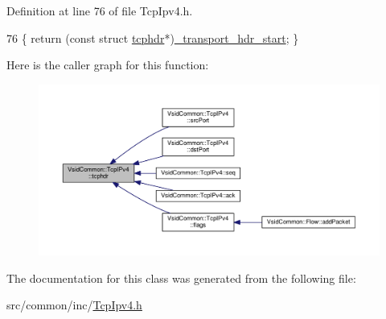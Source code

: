 Definition at line 76 of file Tcp\-Ipv4.\-h.


\begin{DoxyCode}
76 \{ \textcolor{keywordflow}{return} (\textcolor{keyword}{const} \textcolor{keyword}{struct} \hyperlink{class_vsid_common_1_1_tcp_i_pv4_ac51d536f45c517ffb4033a3e02899d11}{tcphdr}*)\hyperlink{class_vsid_common_1_1_i_pv4_packet_adb6dc95e430636380d1f068dc4708def}{\_transport\_hdr\_start}; \}
\end{DoxyCode}


Here is the caller graph for this function\-:
\nopagebreak
\begin{figure}[H]
\begin{center}
\leavevmode
\includegraphics[width=350pt]{class_vsid_common_1_1_tcp_i_pv4_ac51d536f45c517ffb4033a3e02899d11_icgraph}
\end{center}
\end{figure}




The documentation for this class was generated from the following file\-:\begin{DoxyCompactItemize}
\item 
src/common/inc/\hyperlink{_tcp_ipv4_8h}{Tcp\-Ipv4.\-h}\end{DoxyCompactItemize}
